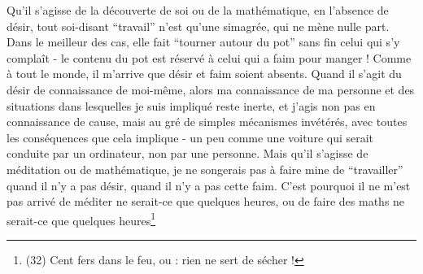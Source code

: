 Qu'il s'agisse de la découverte de soi ou de la mathématique, en l'absence de désir, tout soi-disant ``travail'' n'est qu'une simagrée, qui ne mène nulle part. Dans le meilleur des cas, elle fait ``tourner autour du pot'' sans fin celui qui s'y complaît - le contenu du pot est réservé à celui qui a faim pour manger ! Comme à tout le monde, il m'arrive que désir et faim soient absents. Quand il s'agit du désir de connaissance de moi-même, alors ma connaissance de ma personne et des situations dans lesquelles je suis impliqué reste inerte, et j'agis non pas en connaissance de cause, mais au gré de simples mécanismes invétérés, avec toutes les conséquences que cela implique - un peu comme une voiture qui serait conduite par un ordinateur, non par une personne. Mais qu'il s'agisse de méditation ou de mathématique, je ne songerais pas à faire mine de ``travailler'' quand il n'y a pas désir, quand il n'y a pas cette faim. C'est pourquoi il ne m'est pas arrivé de méditer ne serait-ce que quelques heures, ou de faire des maths ne serait-ce que quelques heures\footnote{(32) Cent fers dans le feu, ou : rien ne sert de sécher ! 

}
